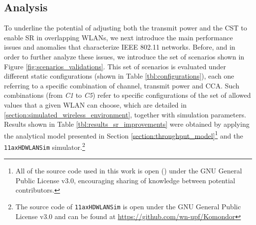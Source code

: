\documentclass{article}
\begin{document}
\subsection{Analysis}
\label{section:spatial_reuse_enhancement}  
To underline the potential of adjusting both the transmit power and the CST to enable SR in overlapping WLANs, we next introduce the main performance issues and anomalies that characterize IEEE 802.11 networks. Before, and in order to further analyze these issues, we introduce the set of scenarios shown in Figure \ref{fig:scenarios_validations}. This set of scenarios is evaluated under different static configurations (shown in Table \ref{tbl:configurations}), each one referring to a specific combination of channel, transmit power and CCA. Such combinations (from \emph{C1} to \emph{C5}) refer to specific configurations of the set of allowed values that a given WLAN can choose, which are detailed in \ref{section:simulated_wireless_environment}, together with simulation parameters. Results shown in Table \ref{tbl:results_sr_improvements} were obtained by applying the analytical model presented in Section \ref{section:throughput_model}\footnote{All of the source code used in this work is open (\citealp{fwilhelmi2018code}) under the GNU General Public License v3.0, encouraging sharing of knowledge between potential contributors.} and the \texttt{11axHDWLANSim} simulator.\footnote{The source code of \texttt{11axHDWLANSim} is open under the GNU General Public License v3.0 and can be found at \url{https://github.com/wn-upf/Komondor}}
\end{document}
